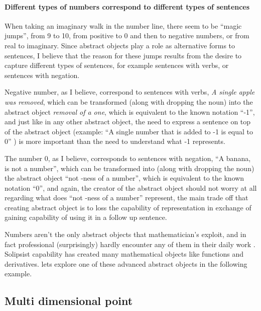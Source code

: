 \documentclass[10pt]{article}
\begin{document}
\paragraph{Different types of numbers correspond to different types of sentences} 
When taking an imaginary walk in the number line, there seem to be “magic jumps”, from 9 to 10, from positive to 0 and then to negative numbers, or from real to imaginary. Since abstract objects play a role as alternative forms to sentences, I believe that the reason for these jumps results from the desire to capture different types of sentences, for example sentences with verbs, or sentences with negation.\par
Negative number, as I believe, correspond to sentences with verbs,  \textit{A single apple was removed}, which can be  transformed (along with dropping the noun)  into the abstract object \textit{removal of a one}, which is equivalent to the known notation “-1”, and just like in any other abstract object, the need to express a sentence on top of the abstract object (example: “A single number that is added to -1 is equal to 0” ) is more important than the need to understand what -1 represents.\par
The number 0, as I believe, corresponds to sentences with negation, “A banana, is not a number”, which can be transformed into (along with dropping the noun) the abstract object “not -ness of a number”, which is equivalent to the known notation “0”, and again, the creator of the abstract object should not worry at all regarding what does “not -ness of a number” represent, the main trade off that creating abstract object is to loss the capability of  representation in exchange of  gaining capability of using it in a follow up sentence.

Numbers aren't the only abstract objects that mathematician’s exploit, and in fact professional (surprisingly)  hardly encounter any of them in their daily work  . Solipsist capability has created many mathematical objects like functions and derivatives. lets explore one of these advanced abstract objects in the following example.

\subsection*{ Multi dimensional point}
\end{document}
